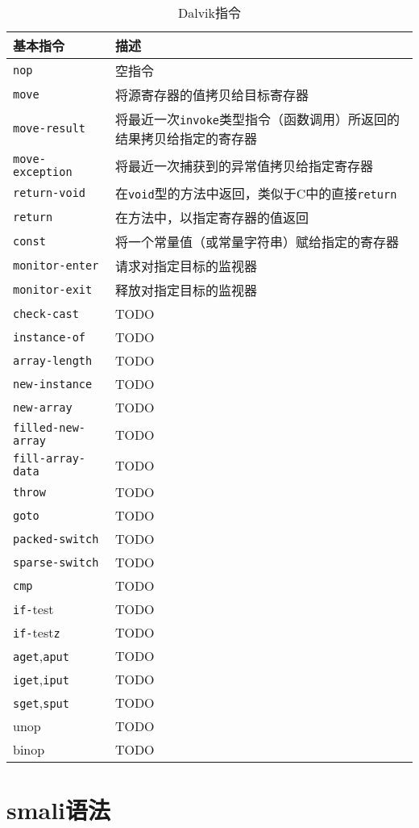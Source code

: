 \begin{table}[htbp]
  \caption{Dalvik指令}
  \centering
  \begin{tabular}{ll}
    \toprule
    基本指令 & 描述 \\
    \midrule
    \lstinline!nop! & 空指令 \\
    \lstinline!move! & 将源寄存器的值拷贝给目标寄存器 \\
    \lstinline!move-result! & 将最近一次\lstinline!invoke!类型指令（函数调用）所返回的结果拷贝给指定的寄存器 \\
    \lstinline!move-exception! & 将最近一次捕获到的异常值拷贝给指定寄存器 \\
    \lstinline!return-void! & 在\lstinline!void!型的方法中返回，类似于C中的直接\lstinline!return! \\
    \lstinline!return! & 在方法中，以指定寄存器的值返回 \\
    \lstinline!const! & 将一个常量值（或常量字符串）赋给指定的寄存器 \\
    \lstinline!monitor-enter! & 请求对指定目标的监视器 \\
    \lstinline!monitor-exit! & 释放对指定目标的监视器 \\
    \lstinline!check-cast! & TODO \\
    \lstinline!instance-of! & TODO \\
    \lstinline!array-length! & TODO \\
    \lstinline!new-instance! & TODO \\
    \lstinline!new-array! & TODO \\
    \lstinline!filled-new-array! & TODO \\
    \lstinline!fill-array-data! & TODO \\
    \lstinline!throw! & TODO \\
    \lstinline!goto! & TODO \\
    \lstinline!packed-switch! & TODO \\
    \lstinline!sparse-switch! & TODO \\
    \lstinline!cmp! & TODO \\
    \lstinline!if-!test & TODO \\
    \lstinline!if-!test\lstinline!z! & TODO \\
    \lstinline!aget!,\lstinline!aput! & TODO \\
    \lstinline!iget!,\lstinline!iput! & TODO \\
    \lstinline!sget!,\lstinline!sput! & TODO \\
    unop & TODO \\
    binop & TODO \\
    \bottomrule
  \end{tabular}
\end{table}
\section{smali语法}
